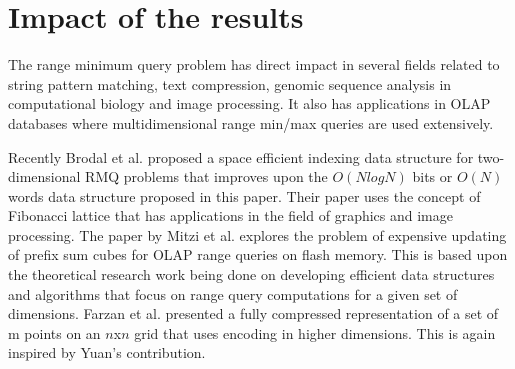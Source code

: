 \section{Impact of the results}
The range minimum query problem has direct impact in several fields related to string pattern matching, text compression, genomic sequence analysis in computational biology and image  processing. It also has applications in OLAP databases where multidimensional range min/max queries are used extensively.\par
Recently Brodal et al.\cite{p11} proposed a space efficient indexing data structure for two-dimensional RMQ problems that improves upon the $O(NlogN)$ bits or $O(N)$ words data structure proposed in this paper. Their paper uses the concept of Fibonacci lattice that has applications in the field of graphics and image processing. The paper by Mitzi et al.\cite{p12} explores the problem of expensive updating of prefix sum cubes for OLAP range queries on flash memory. This is based upon the theoretical research work being done on developing efficient data structures and algorithms that focus on range query computations for a given set of dimensions. Farzan et al. \cite{p14} presented a fully compressed representation of a set of m points on an $n$x$n$ grid that uses encoding in higher dimensions. This is again inspired by Yuan's contribution.

